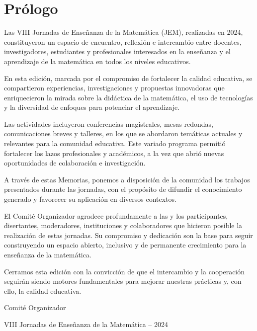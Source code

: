 \section*{\centering \sffamily Prólogo}

Las VIII Jornadas de Enseñanza de la Matemática (JEM), realizadas en 2024, constituyeron un espacio de encuentro, reflexión e intercambio entre docentes, investigadores, estudiantes y profesionales interesados en la enseñanza y el aprendizaje de la matemática en todos los niveles educativos.

En esta edición, marcada por el compromiso de fortalecer la calidad educativa, se compartieron experiencias, investigaciones y propuestas innovadoras que enriquecieron la mirada sobre la didáctica de la matemática, el uso de tecnologías y la diversidad de enfoques para potenciar el aprendizaje.

Las actividades incluyeron conferencias magistrales, mesas redondas, comunicaciones breves y talleres, en los que se abordaron temáticas actuales y relevantes para la comunidad educativa. Este variado programa permitió fortalecer los lazos profesionales y académicos, a la vez que abrió nuevas oportunidades de colaboración e investigación.

A través de estas Memorias, ponemos a disposición de la comunidad los trabajos presentados durante las jornadas, con el propósito de difundir el conocimiento generado y favorecer su aplicación en diversos contextos.

El Comité Organizador agradece profundamente a las y los participantes, disertantes, moderadores, instituciones y colaboradores que hicieron posible la realización de estas jornadas. Su compromiso y dedicación son la base para seguir construyendo un espacio abierto, inclusivo y de permanente crecimiento para la enseñanza de la matemática.

Cerramos esta edición con la convicción de que el intercambio y la cooperación seguirán siendo motores fundamentales para mejorar nuestras prácticas y, con ello, la calidad educativa.

\vspace{5cm}

\begin{center}
	{\Large Comité Organizador}
	
	{\normalfont VIII Jornadas de Enseñanza de la Matemática – 2024}
\end{center}